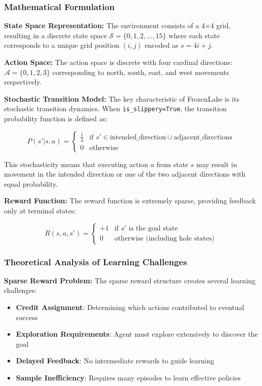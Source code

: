 \documentclass[12pt]{article}
\begin{document}
{{{\subsubsection{Mathematical Formulation}

\textbf{State Space Representation:}
The environment consists of a 4×4 grid, resulting in a discrete state space $\mathcal{S} = \{0, 1, 2, \ldots, 15\}$ where each state corresponds to a unique grid position $(i,j)$ encoded as $s = 4i + j$.

\textbf{Action Space:}
The action space is discrete with four cardinal directions: $\mathcal{A} = \{0, 1, 2, 3\}$ corresponding to north, south, east, and west movements respectively.

\textbf{Stochastic Transition Model:}
The key characteristic of FrozenLake is its stochastic transition dynamics. When \texttt{is_slippery=True}, the transition probability function is defined as:

\begin{equation}
P(s'|s,a) = \begin{cases}
\frac{1}{3} & \text{if } s' \in \text{intended\_direction} \cup \text{adjacent\_directions} \\
0 & \text{otherwise}
\end{cases}
\end{equation}

This stochasticity means that executing action $a$ from state $s$ may result in movement in the intended direction or one of the two adjacent directions with equal probability.

\textbf{Reward Function:}
The reward function is extremely sparse, providing feedback only at terminal states:

\begin{equation}
R(s,a,s') = \begin{cases}
+1 & \text{if } s' \text{ is the goal state} \\
0 & \text{otherwise (including hole states)}
\end{cases}
\end{equation}

\subsubsection{Theoretical Analysis of Learning Challenges}

\textbf{Sparse Reward Problem:}
The sparse reward structure creates several learning challenges:

\begin{itemize}
    \item \textbf{Credit Assignment}: Determining which actions contributed to eventual success
    \item \textbf{Exploration Requirements}: Agent must explore extensively to discover the goal
    \item \textbf{Delayed Feedback}: No intermediate rewards to guide learning
    \item \textbf{Sample Inefficiency}: Requires many episodes to learn effective policies
\end{itemize}

}}}
\end{document}
